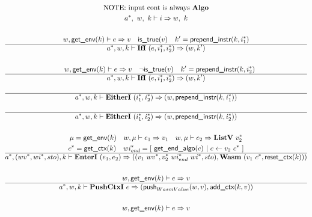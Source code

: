 \begin{gather*}
  \text{NOTE: input cont is always \algo} \\
  \seq{a}, ~ w, ~ k \vdash i \Rightarrow w, ~ k \\
%
\newline \\
  w, \getenv(k) \vdash e \Rightarrow v \quad
  \istrue(v) \quad k' = \prependinstr(k, \seq{i_1}) \\
  \hline
  \seq{a}, w, k \vdash \ifi ~ (e, \seq{i_1}, \seq{i_2}) \Rightarrow (w, k') \\
%
\newline \\
  \quad w, \getenv(k) \vdash e \Rightarrow v \quad
  \neg \istrue(v) \quad k' = \prependinstr(k, \seq{i_2}) \\
  \hline
  \seq{a}, w, k \vdash \ifi ~ (e, \seq{i_1}, \seq{i_2}) \Rightarrow (w, k') \\
%
\newline \\
  \hline
  \seq{a}, w, k \vdash \eitheri ~ (\seq{i_1}, \seq{i_2}) \Rightarrow (w, \prependinstr(k, \seq{i_1})) \\
%
\newline \\
  \hline
  \seq{a}, w, k \vdash \eitheri ~ (\seq{i_1}, \seq{i_2}) \Rightarrow (w, \prependinstr(k, \seq{i_2})) \\
%
\newline \\
  \mu = \getenv(k) \quad
  w, \mu \vdash e_1 \Rightarrow v_1 \quad
  w, \mu \vdash e_2 \Rightarrow \listv ~ \seq{v_2} \\
  \seq c = \getctx(k) \quad
  \seq{wi_{end}} = [ ~ \getendalgo(c) ~ | ~ c \leftarrow v_2 ~ \seq c ~ ] \\
  \hline
  \seq{a}, (\seq{wv}, \seq{wi}, sto), k \vdash \enteri ~ (e_1, e_2)
  \Rightarrow
  ((v_1 ~ \seq{wv}, \seq{v_2} ~ \seq{wi_{end}}~ \seq{wi}, sto), \wasm ~ (v_1 ~ \seq c, \resetctx(k))) \\
%
\newline \\
  w, \getenv(k) \vdash e \Rightarrow v \\
  \hline
  \seq{a}, w, k \vdash \pushctxi ~ e
  \Rightarrow
  (\push_{WasmValue}(w, v), \addctx(k, v)) \\
%
\newline \\
  w, \getenv(k) \vdash e \Rightarrow v \\

\end{gather*}
